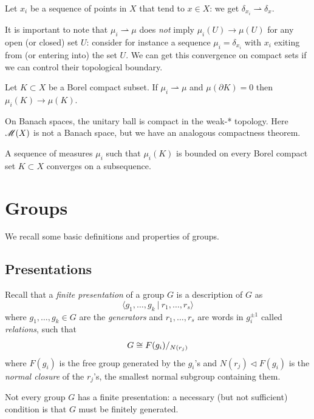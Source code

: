 \begin{ex} 
Let $x_i$ be a sequence of points in $X$ that tend to $x\in X$: we get $\delta_{x_i} \rightharpoonup \delta_x$. 
\end{ex}

It is important to note that $\mu_i \rightharpoonup \mu$ does \emph{not} imply $\mu_i(U) \to \mu(U)$ for any open (or closed) set $U$: consider for instance a sequence $\mu_i = \delta_{x_i}$ with $x_i$ exiting from (or entering into) the set $U$. We can get this convergence on compact sets if we can control their topological boundary.

\begin{prop} \label{delta:zero:prop}
Let $K\subset X$ be a Borel compact subset. If $\mu_i \rightharpoonup \mu$ and $\mu(\partial K)=0$ then $\mu_i(K) \to \mu(K)$.
\end{prop}

On Banach spaces, the unitary ball is compact in the weak-* topology. Here $\mathscr{M}(X)$ is not a Banach space, but we have an analogous compactness theorem.

\begin{teo} \label{compact:measure:teo}
A sequence of measures $\mu_i$ such that $\mu_i(K)$ is bounded on every Borel compact set $K\subset X$ converges on a subsequence.
\end{teo}

\section{Groups}
We recall some basic definitions and properties of groups. 

\subsection{Presentations}
Recall that a \emph{finite presentation} of a group $G$ is a description of $G$ as
$$\langle g_1,\ldots, g_k\ |\ r_1,\ldots, r_s \rangle$$
where $g_1,\ldots, g_k\in G$ are the \emph{generators} and $r_1,\ldots, r_s$ are words in $g_i^{\pm 1}$ called \emph{relations}, such that 
$$G \cong F(g_i)/_{N(r_j)}$$
where $F(g_i)$ is the free group generated by the $g_i$'s and $N(r_j)\triangleleft F(g_i)$ is the \emph{normal closure} of the $r_j$'s, the smallest normal subgroup containing them. 

Not every group $G$ has a finite presentation: a necessary (but not sufficient) condition is that $G$ must be finitely generated. 

